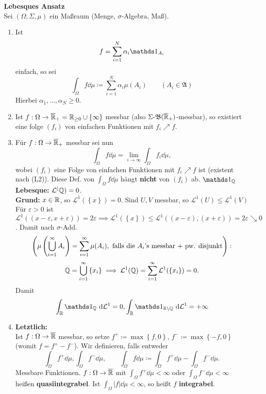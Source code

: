 \textbf{Lebesques Ansatz}\\
Sei $ (\Omega, \Sigma, \mu) $ ein Maßraum (Menge, $ \sigma $-Algebra, Maß).
\begin{enumerate}[label=(L\arabic*)]
	\item Ist
		\[
			f = \sum_{i=1}^{N} \alpha_i \I_{A_i} 
		\]
		einfach, so sei
		\[
			\int _{\Omega} f \dd \mu \coloneqq \sum_{i=1}^{N} \alpha_i \mu (A_i) \qquad (A_i \in \mathfrak{A} )
		\]
		Hierbei $ \alpha_1, \dotsc, \alpha_N \geq 0 $.
	\item Ist $ f : \Omega \to \overline{\mathbb{R} } _+ = \mathbb{R} _{\geq 0} \cup \left\{ \infty \right\}  $ messbar (also $ \Sigma \text{-}  \mathfrak{B} (\overline{\mathbb{R} } _+) $-messbar), so existiert eine folge $ (f_i) $ von einfachen Funktionen mit $ f_i \nearrow f $.
	\item Für $ f : \Omega \to \overline{\mathbb{R} } _+ $ messbar sei nun
		\[
			\int _\Omega f \dd \mu = \lim_{i \to \infty} \int _\Omega f_i \dd \mu,
		\]
		wobei $ (f_i) $ eine Folge von einfachen Funktionen mit $ f_i \nearrow f $ ist (existent nach (L2)).
		Diese Def. von $ \int _\Omega f \dd \mu $ hängt \textbf{nicht} von $ (f_i) $ ab.
		$ \I_\Q  $\\
		\textbf{Lebesque:} $ \mathcal{L} ^(\mathbb{Q} ) = 0 $.\\
		\textbf{Grund:} $ x \in \mathbb{R}  $, so $ \mathcal{L} ^1\left( \left\{ x \right\}  \right) = 0 $.
		Sind $ U, V $ messbar, so $ \mathcal{L} ^1(U) \leq \mathcal{L} ^1(V) $ 
		Für $ \varepsilon > 0 $ ist $ \mathcal{L} ^1((x - \varepsilon, x + \varepsilon )) = 2 \varepsilon  \implies \mathcal{L} ^1(\left\{ x \right\} ) \leq \mathcal{L} ^1 ((x - \varepsilon ), (x + \varepsilon )) = 2 \varepsilon \searrow 0 $.
		Damit nach $ \sigma $-Add. 
		\[
			\left( \mu \left( \bigcup_{i = 1} ^\infty A_i \right) = \sum_{i=1}^{\infty} \mu (A_i), \text{ falls  die $ A_i $'s messbar + pw. disjunkt}  \right) :
		\]
		\[
			\mathbb{Q}  = \bigcup_{i = 1} ^\infty \left\{ x_i \right\} \implies \mathcal{L} ^1(\mathbb{Q} ) = \sum_{i=1}^{\infty} \mathcal{L} ^1 ( \left\{ x_i \right\} ) = 0.
		\]
		Damit
		\[
			\int_{\R }^{} \I_{\Q } \dd \mathcal{L} ^1 = 0, \int_{\R }^{} \I_{\R  \setminus \Q } \dd \mathcal{L} ^1 = +\infty
		\]
	\item \textbf{Letztlich:}\\
		Ist $ f : \Omega \to \overline{\mathbb{R} }  $ messbar, so setze $ f^+ \coloneqq \max \left\{ f, 0 \right\}  $, $ f^- \coloneqq \max \left\{ -f, 0 \right\}  $ (womit $ f = f^+ - f^- $).
		Wir definieren, falls entweder
		\[
			\int _\Omega f^+ \dd \mu, \int _\Omega f^{-} \dd \mu, \qquad \int _\Omega f \dd \mu \coloneqq \int _\Omega f^+ \dd \mu - \int_{\Omega}^{} f^- \dd \mu.
		\]
		Messbare Funktionen.
		$ f : \Omega \to \overline{\mathbb{R} }  $ mit $ \int _\Omega f^+ \dd \mu < \infty $ oder $ \int _\Omega f^- \dd \mu < \infty $ heißen \textbf{quasiintegrabel}.
		Ist $ \int_{\Omega}^{} \left| f \right| \dd \mu < \infty $, so heißt $ f $ \textbf{integrabel}.
\end{enumerate}

